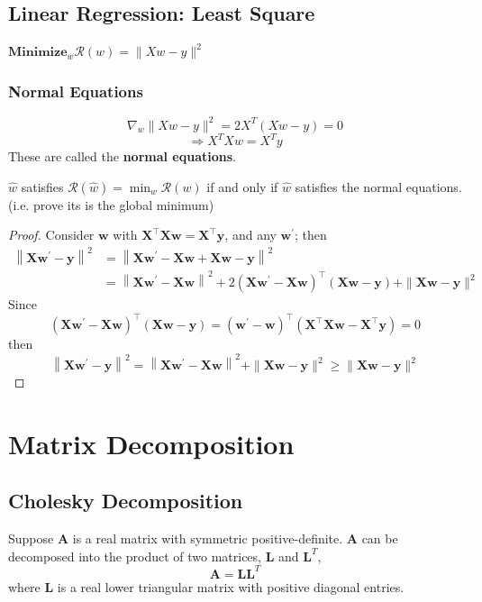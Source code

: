\documentclass[11pt]{elegantbook}
\begin{document}
\section{Linear Regression: Least Square}
$\textbf{Minimize}_w \mathcal{R}(w)=\|Xw-y\|^2$
\subsection{Normal Equations}
$$\nabla_w\|Xw-y\|^2=2X^T(Xw-y)=0$$
$$\Rightarrow X^TXw=X^Ty$$
These are called the \textbf{normal equations}.
\begin{proposition}
    $\hat{w}$ satisfies $\mathcal{R}(\hat{w})=\min_w\mathcal{R}(w)$ if and only if $\hat{w}$ satisfies the normal equations. (i.e. prove its is the global minimum)
\end{proposition}
\begin{proof}
Consider $\boldsymbol{w}$ with $\boldsymbol{X}^{\top} \boldsymbol{X} \boldsymbol{w}=\boldsymbol{X}^{\top} \boldsymbol{y}$, and any $\boldsymbol{w}^{\prime}$; then $$\begin{aligned}\left\|\boldsymbol{X} \boldsymbol{w}^{\prime}-\boldsymbol{y}\right\|^{2} &=\left\|\boldsymbol{X} \boldsymbol{w}^{\prime}-\boldsymbol{X} \boldsymbol{w}+\boldsymbol{X} \boldsymbol{w}-\boldsymbol{y}\right\|^{2} \\ &=\left\|\boldsymbol{X} \boldsymbol{w}^{\prime}-\boldsymbol{X} \boldsymbol{w}\right\|^{2}+2\left(\boldsymbol{X} \boldsymbol{w}^{\prime}-\boldsymbol{X} \boldsymbol{w}\right)^{\top}(\boldsymbol{X} \boldsymbol{w}-\boldsymbol{y})+\|\boldsymbol{X} \boldsymbol{w}-\boldsymbol{y}\|^{2} \end{aligned}$$
Since
$$
\left(\boldsymbol{X} \boldsymbol{w}^{\prime}-\boldsymbol{X} \boldsymbol{w}\right)^{\top}(\boldsymbol{X} \boldsymbol{w}-\boldsymbol{y})=\left(\boldsymbol{w}^{\prime}-\boldsymbol{w}\right)^{\top}\left(\boldsymbol{X}^{\top} \boldsymbol{X} \boldsymbol{w}-\boldsymbol{X}^{\top} \boldsymbol{y}\right)=0
$$
then
$$
\left\|\boldsymbol{X} \boldsymbol{w}^{\prime}-\boldsymbol{y}\right\|^{2}=\left\|\boldsymbol{X} \boldsymbol{w}^{\prime}-\boldsymbol{X} \boldsymbol{w}\right\|^{2}+\|\boldsymbol{X} \boldsymbol{w}-\boldsymbol{y}\|^{2} \geq\|\boldsymbol{X} \boldsymbol{w}-\boldsymbol{y}\|^{2}
$$
\end{proof}

\chapter{Matrix Decomposition}
\section{Cholesky Decomposition}
Suppose $\boldsymbol{A}$ is a real matrix with symmetric positive-definite. $\boldsymbol{A}$ can be decomposed into the product of two matrices, $\boldsymbol{L}$ and $\boldsymbol{L}^T$,
$$\boldsymbol{A}=\boldsymbol{L}\boldsymbol{L}^T$$
where $\boldsymbol{L}$ is a real lower triangular matrix with positive diagonal entries.
\end{document}
